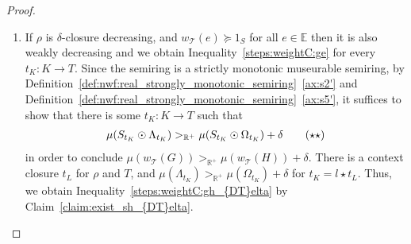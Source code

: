\begin{proof}
\begin{enumerate}
        \item
            If $\rho$ is $\delta$-closure decreasing, and $w_\mathcal{T}(e) \succeq 1_S$ for all $e \in \mathbb{E}$ then it is also weakly decreasing and we obtain Inequality~\eqref{steps:weightC:ge} for every $t_K : K \to T$.
            Since the semiring is a strictly monotonic museurable semiring,  by Definition~\ref{def:nwf:real_strongly_monotonic_semiring}~\eqref{ax:s2'} and Definition~\ref{def:nwf:real_strongly_monotonic_semiring}~\eqref{ax:s5'}, it suffices to show that there is some $t_K : K \to T$ such that 
            \begin{align}
                \mu(S_{t_K} \odot \Lambda_{t_K}) >_{\mathbb{R}^+} \mu(S_{t_K} \odot \Omega_{t_K}) + 
                \delta
              \tag{$\star\star$}\label{steps:weightC:gh_{DT}elta}
            \end{align}
            in order to conclude $ \mu(w_\mathcal{T}(G)) >_{\mathbb{R}^+} \mu(w_\mathcal{T}(H)) + \delta$.
            There is a context closure $t_L$ for $\rho$ and $T$, and
            $\mu(\Lambda_{t_K}) >_{\mathbb{R}^+} \mu(\Omega_{t_K}) + \delta$
            for $t_K = l \star t_L$. Thus, we obtain Inequality~\eqref{steps:weightC:gh_{DT}elta} by Claim~\ref{claim:exist_sh_{DT}elta}.
    \end{enumerate}
\end{proof}  